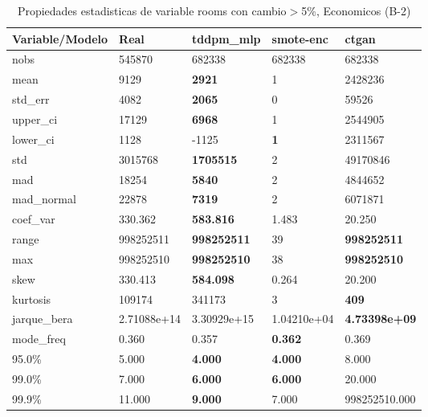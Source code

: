 \begin{table}[H]
\centering
\fontsize{8}{14}\selectfont
\caption{Propiedades estadisticas de variable rooms con cambio\ensuremath{>}5\%, Economicos (B-2)}
\label{table-stats-economicos-b-2-rooms-short}
\begin{tabular}{|l|m{10em}|m{10em}|m{10em}|m{10em}|}
\hline
 \rowcolor[gray]{0.8}
Variable/Modelo & Real & tddpm\_mlp & smote-enc & ctgan \\
\hline nobs & 545870 & 682338 & 682338 & 682338 \\
\hline mean & 9129 & \bfseries 2921 & 1 & \cellcolor[rgb]{0.9, 0.54, 0.52} 2428236 \\
\hline std\_err & 4082 & \bfseries 2065 & 0 & \cellcolor[rgb]{0.9, 0.54, 0.52} 59526 \\
\hline upper\_ci & 17129 & \bfseries 6968 & 1 & \cellcolor[rgb]{0.9, 0.54, 0.52} 2544905 \\
\hline lower\_ci & 1128 & -1125 & \bfseries 1 & \cellcolor[rgb]{0.9, 0.54, 0.52} 2311567 \\
\hline std & 3015768 & \bfseries 1705515 & 2 & \cellcolor[rgb]{0.9, 0.54, 0.52} 49170846 \\
\hline mad & 18254 & \bfseries 5840 & 2 & \cellcolor[rgb]{0.9, 0.54, 0.52} 4844652 \\
\hline mad\_normal & 22878 & \bfseries 7319 & 2 & \cellcolor[rgb]{0.9, 0.54, 0.52} 6071871 \\
\hline coef\_var & 330.362 & \bfseries 583.816 & \cellcolor[rgb]{0.9, 0.54, 0.52} 1.483 & 20.250 \\
\hline range & 998252511 & \bfseries 998252511 & \cellcolor[rgb]{0.9, 0.54, 0.52} 39 & \bfseries 998252511 \\
\hline max & 998252510 & \bfseries 998252510 & \cellcolor[rgb]{0.9, 0.54, 0.52} 38 & \bfseries 998252510 \\
\hline skew & 330.413 & \bfseries 584.098 & \cellcolor[rgb]{0.9, 0.54, 0.52} 0.264 & 20.200 \\
\hline kurtosis & 109174 & \cellcolor[rgb]{0.9, 0.54, 0.52} 341173 & 3 & \bfseries 409 \\
\hline jarque\_bera & 2.71088e+14 & \cellcolor[rgb]{0.9, 0.54, 0.52} 3.30929e+15 & 1.04210e+04 & \bfseries 4.73398e+09 \\
\hline mode\_freq & 0.360 & 0.357 & \bfseries 0.362 & \cellcolor[rgb]{0.9, 0.54, 0.52} 0.369 \\
\hline 95.0\% & 5.000 & \bfseries 4.000 & \bfseries 4.000 & \cellcolor[rgb]{0.9, 0.54, 0.52} 8.000 \\
\hline 99.0\% & 7.000 & \bfseries 6.000 & \bfseries 6.000 & \cellcolor[rgb]{0.9, 0.54, 0.52} 20.000 \\
\hline 99.9\% & 11.000 & \bfseries 9.000 & 7.000 & \cellcolor[rgb]{0.9, 0.54, 0.52} 998252510.000 \\
\hline
\end{tabular}
\end{table}
